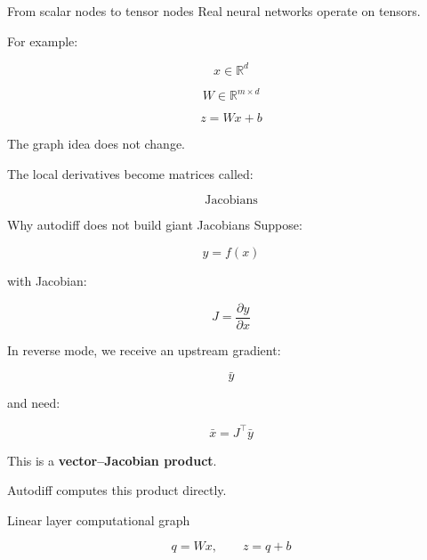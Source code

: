 \documentclass[10pt,aspectratio=169]{beamer}
\newcommand{\grad}[2]{\frac{\partial #1}{\partial #2}}
\newcommand{\adj}[1]{\bar{#1}}
\begin{document}
\begin{frame}[t]{From scalar nodes to tensor nodes}
Real neural networks operate on tensors.

For example:

\[
x\in\mathbb{R}^{d}
\]

\[
W\in\mathbb{R}^{m\times d}
\]

\[
z=Wx+b
\]

The graph idea does not change.

The local derivatives become matrices called:

\[
\boxed{\text{Jacobians}}
\]
\end{frame}

\begin{frame}[t]{Why autodiff does not build giant Jacobians}
Suppose:

\[
y=f(x)
\]

with Jacobian:

\[
J=\grad{y}{x}
\]

In reverse mode, we receive an upstream gradient:

\[
\adj{y}
\]

and need:

\[
\boxed{
\adj{x}=J^\top\adj{y}
}
\]

This is a \textbf{vector--Jacobian product}.

Autodiff computes this product directly.
\end{frame}

\begin{frame}[t]{Linear layer computational graph}
\centering


\vspace{0.35cm}

\[
q=Wx,\qquad z=q+b
\]
\end{frame}
\end{document}
